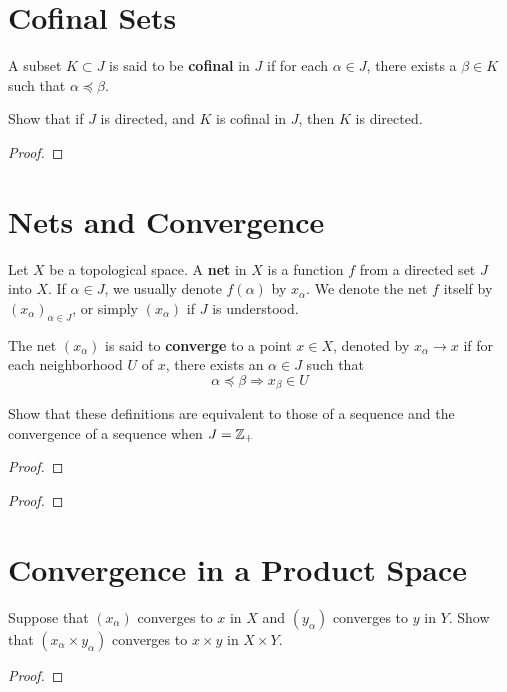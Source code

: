 \documentclass[12pt]{article}
\begin{document}
\section{Cofinal Sets}
\begin{defn}
    A subset $K \subset J$ is said to be \textbf{cofinal} in $J$ if for each $\alpha \in J$, there exists a $\beta \in K$ such that $\alpha \preceq \beta$.
\end{defn}

Show that if $J$ is directed, and $K$ is cofinal in $J$, then $K$ is directed.

\begin{proof}
\end{proof}

\section{Nets and Convergence}
\begin{defn}
    Let $X$ be a topological space. A \textbf{net} in $X$ is a function $f$ from a directed set $J$ into $X$. If $\alpha \in J$, we usually denote $f(\alpha)$ by $x_\alpha$. We denote the net $f$ itself by ${\left(x_\alpha\right)}_{\alpha \in J}$, or simply $(x_\alpha)$ if $J$ is understood.
\end{defn}
\begin{defn}
    The net $(x_\alpha)$ is said to \textbf{converge} to a point $x \in X$, denoted by $x_\alpha \to x$ if for each neighborhood $U$ of $x$, there exists an $\alpha \in J$ such that
    \[\alpha \preceq \beta \Longrightarrow x_\beta \in U\]
\end{defn}

Show that these definitions are equivalent to those of a sequence and the convergence of a sequence when $J = \mathbb{Z}_+$

\begin{proof}
\end{proof}
\begin{proof}
\end{proof}

\section{Convergence in a Product Space}
Suppose that $(x_\alpha)$ converges to $x$ in $X$ and $(y_\alpha)$ converges to $y$ in $Y$. Show that $(x_\alpha \times y_\alpha)$ converges to $x \times y$ in $X \times Y$.
\begin{proof}
\end{proof}
\end{document}
